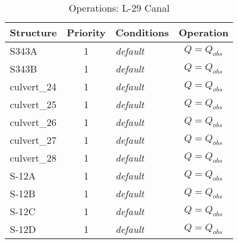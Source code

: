 \scriptsize
\begin{table}[!h]
\centering
\caption{Operations: L-29 Canal}
\label{tab:M11opsL29a}
\begin{tabular}{|l|c|l|c|c|}
\hline
\textbf{Structure} & \textbf{Priority}  & \textbf{Conditions} & \multicolumn{2}{|c|}{\textbf{Operation}}   \\
\hline
\hline
S343A         &  1  & \it{default}    & \multicolumn{2}{|c|}{$Q = Q_{obs}$}   \\
\hline
S343B         &  1  & \it{default}    & \multicolumn{2}{|c|}{$Q = Q_{obs}$}   \\
\hline
\hline
culvert\_24   &  1  & \it{default}    & \multicolumn{2}{|c|}{$Q = Q_{obs}$}   \\
\hline
culvert\_25   &  1  & \it{default}    & \multicolumn{2}{|c|}{$Q = Q_{obs}$}   \\
\hline
culvert\_26   &  1  & \it{default}    & \multicolumn{2}{|c|}{$Q = Q_{obs}$}   \\
\hline
culvert\_27   &  1  & \it{default}    & \multicolumn{2}{|c|}{$Q = Q_{obs}$}   \\
\hline
culvert\_28   &  1  & \it{default}    & \multicolumn{2}{|c|}{$Q = Q_{obs}$}   \\
\hline
\hline
S-12A         &  1  & \it{default}    & \multicolumn{2}{|c|}{$Q = Q_{obs}$}   \\
\hline
S-12B         &  1  & \it{default}    & \multicolumn{2}{|c|}{$Q = Q_{obs}$}   \\
\hline
S-12C         &  1  & \it{default}    & \multicolumn{2}{|c|}{$Q = Q_{obs}$}   \\
\hline
S-12D         &  1  & \it{default}    & \multicolumn{2}{|c|}{$Q = Q_{obs}$}   \\
\hline
\hline
\end{tabular}
\end{table}
\normalsize

